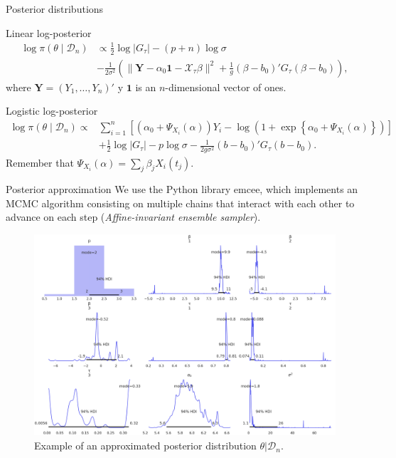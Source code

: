 \documentclass[10pt, english, professionalfonts]{beamer}
\newcommand\maroon[1]{\color{mLightBrown}#1\color{mDarkTeal}}
\begin{document}
\begin{frame}{Posterior distributions}
  \begin{block}{Linear log-posterior}
    \vspace{-1em}
    \begin{align*}
  \log \pi(\theta\mid \mathcal D_n) &\propto \frac{1}{2}\log |G_\tau| - (p+n)\log \sigma\\
  &-\frac{1}{2\sigma^2} \left(\|\boldsymbol{Y}-\alpha_0\boldsymbol{1} - \mathcal X_\tau\beta\|^2 + \frac{1}{g}(\beta - b_0)'G_\tau(\beta - b_0) \right),
\end{align*}
where \(\bm Y=(Y_1,\dots,Y_n)'\) y \(\bm{1}\) is an \(n\)-dimensional vector of ones.
  \end{block}

\vspace{1em}
  \begin{block}{Logistic log-posterior}
      \vspace{-1em}
    \begin{align*}
  \log \pi(\theta \mid \mathcal D_n) \propto {} & \sum_{i=1}^n \left[ \left(\alpha_0 + \Psi_{X_i}(\alpha)\right)Y_i - \log\left(1 + \exp\left\{\alpha_0 + \Psi_{X_i}(\alpha)\right\}\right)\right]\\
  \quad &+ \frac{1}{2}\log |G_\tau| - p\log \sigma -\frac{1}{2g\sigma^2} (b - b_0)'G_\tau(b - b_0).
\end{align*}
Remember that \(\Psi_{X_i}(\alpha) = \sum_j \beta_j X_i(t_j)\).
  \end{block}
\end{frame}

\begin{frame}{Posterior approximation}
  We use the Python library \maroon{emcee}, which implements an MCMC algorithm consisting on multiple chains that interact with each other to advance on each step (\textit{Affine-invariant ensemble sampler}).

  \vspace{1em}

  \begin{figure}
    \includegraphics[width=.7\textwidth]{img/posterior}
    \caption{Example of an approximated posterior distribution \(\theta|\mathcal D_n\).}
  \end{figure}
\end{frame}
\end{document}
